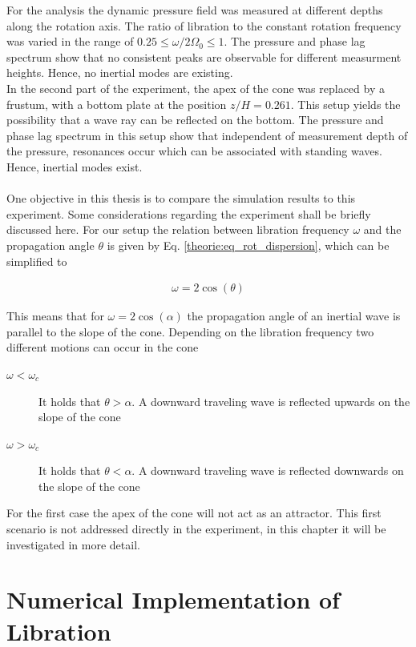 For the analysis the dynamic pressure field was measured at different depths along the rotation axis.
The ratio of libration to the constant rotation frequency was varied in the range of ${0.25\leq\omega/2\Omega_0\leq1}$.
The pressure and phase lag spectrum  show that no consistent peaks are observable for different measurment heights.
Hence, no inertial modes are existing.
\\
In the second part of the experiment, the apex of the cone was replaced by a frustum,
with a bottom plate at the position $z/H = 0.261$.
This setup yields the possibility that a wave ray can be reflected on the bottom.
The pressure and phase lag spectrum in this setup show that
independent of measurement depth of the pressure, resonances occur which can be associated with standing waves.
Hence, inertial modes exist.
\\
\\
One objective in this thesis is to compare the simulation results to this experiment.
Some considerations regarding the experiment shall be briefly discussed here.
For our setup the relation between libration frequency $\omega$ and the propagation angle $\theta$
is given by Eq. \ref{theorie:eq_rot_dispersion}, which can be simplified to

\begin{align}
    \omega = 2\cos(\theta)
\end{align}

This means that for $\omega = 2\cos(\alpha)$ the propagation angle of an inertial wave is parallel to the slope of the cone.
Depending on the libration frequency two different motions can occur in the cone

\begin{description}
    \item[$\omega < \omega_c$]{It holds that $\theta > \alpha$. A downward traveling wave is reflected upwards on the slope of the cone}
    \item[$\omega > \omega_c$]{It holds that $\theta < \alpha$. A downward traveling wave is reflected downwards on the slope of the cone}
\end{description}

For the first case the apex of the cone will not act as an attractor.
This first scenario is not addressed directly in the experiment, in this chapter it will be investigated in more detail.

\section{Numerical Implementation of Libration}

